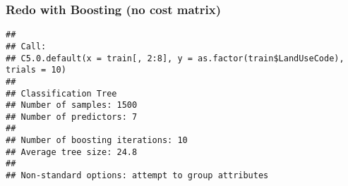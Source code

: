 \documentclass[
]{article}
\newenvironment{Shaded}{\begin{snugshade}}{\end{snugshade}}
\newcommand{\AttributeTok}[1]{\textcolor[rgb]{0.77,0.63,0.00}{#1}}
\newcommand{\CommentTok}[1]{\textcolor[rgb]{0.56,0.35,0.01}{\textit{#1}}}
\newcommand{\ConstantTok}[1]{\textcolor[rgb]{0.00,0.00,0.00}{#1}}
\newcommand{\DecValTok}[1]{\textcolor[rgb]{0.00,0.00,0.81}{#1}}
\newcommand{\FunctionTok}[1]{\textcolor[rgb]{0.00,0.00,0.00}{#1}}
\newcommand{\NormalTok}[1]{#1}
\newcommand{\OtherTok}[1]{\textcolor[rgb]{0.56,0.35,0.01}{#1}}
\newcommand{\SpecialCharTok}[1]{\textcolor[rgb]{0.00,0.00,0.00}{#1}}
\newcommand{\StringTok}[1]{\textcolor[rgb]{0.31,0.60,0.02}{#1}}
\begin{document}
\hypertarget{redo-with-boosting-no-cost-matrix}{%
\subsubsection{Redo with Boosting (no cost
matrix)}\label{redo-with-boosting-no-cost-matrix}}

\begin{Shaded}
\end{Shaded}

\begin{verbatim}
## 
## Call:
## C5.0.default(x = train[, 2:8], y = as.factor(train$LandUseCode), trials = 10)
## 
## Classification Tree
## Number of samples: 1500 
## Number of predictors: 7 
## 
## Number of boosting iterations: 10 
## Average tree size: 24.8 
## 
## Non-standard options: attempt to group attributes
\end{verbatim}

\begin{Shaded}
\end{Shaded}
\end{document}

